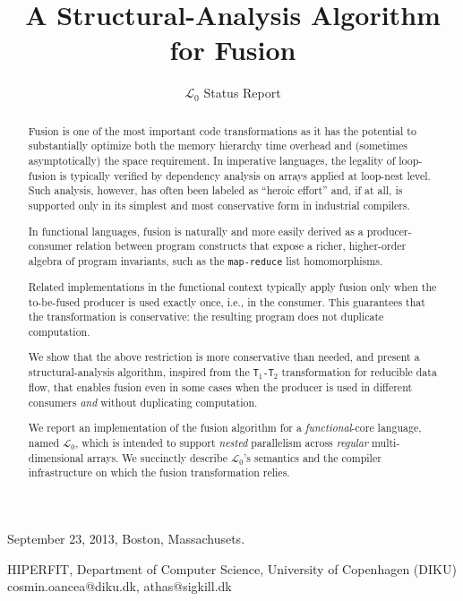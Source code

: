 \documentclass{sigplanconf}  %
\newcommand{\comment}[2]{\textcolor{red}{\scriptsize \textsf \textbf{#1:}{#2}}}
\begin{document}
 {September 23, 2013, Boston, Massachusets.}


\title{A Structural-Analysis Algorithm for Fusion}
\subtitle{$\mathcal{L}_0$ Status Report}


           {HIPERFIT, Department of Computer Science, University of Copenhagen (DIKU)}
           {cosmin.oancea@diku.dk, athas@sigkill.dk}



\maketitle



\begin{abstract}

Fusion is one of the most important code transformations as it 
has the potential to substantially optimize both the memory hierarchy 
time overhead and (sometimes asymptotically) the space requirement.
%
In imperative languages, the legality of loop-fusion is typically 
verified by dependency analysis on arrays applied at loop-nest level.
Such analysis, however, has often been labeled as ``heroic effort''
and, if at all, is supported only in its simplest and most
conservative form in industrial compilers.  

In functional languages, fusion is naturally and more easily derived
as a producer-consumer relation between program constructs that expose
a richer, higher-order algebra of program invariants, 
such as the {\tt map-reduce} list homomorphisms. %

Related implementations in the functional context typically 
apply fusion only when the to-be-fused producer is used exactly once,
i.e., in the consumer.   This guarantees that the transformation is
conservative: the resulting program does not duplicate computation.

We show that the above restriction is more conservative than needed,
and present a structural-analysis algorithm, inspired
from the {\tt T$_1$-T$_2$} transformation for reducible data flow,
that enables fusion even in some cases when the producer is used 
in different consumers {\em and} without duplicating computation.  

We report an implementation of the fusion algorithm for a 
{\em functional}-core language, named $\mathcal{L}_0$, which is intended 
to support {\em nested} parallelism across {\em regular} 
multi-dimensional arrays.  We succinctly describe $\mathcal{L}_0$'s
semantics and the compiler infrastructure on which the fusion
transformation relies.

\end{abstract}
\end{document}
